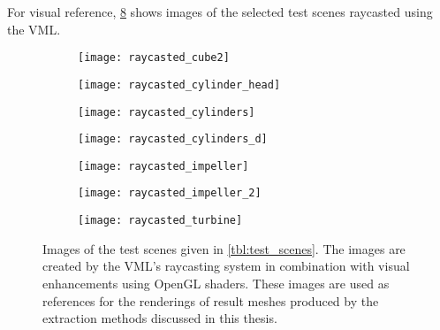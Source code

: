 For visual reference, \cref{fig:raycasted_scenes} shows images of the selected test scenes raycasted using the VML.
%
\begin{figure}[!]
	\centering
	\begin{subfigure}[b]{0.43\textwidth}
		\centering
		\texttt{[image: raycasted\_cube2]}
		\caption{\cubes}
		\label{fig:cube2_raycasted}
	\end{subfigure}
	\begin{subfigure}[b]{0.43\textwidth}
		\centering
		\texttt{[image: raycasted\_cylinder\_head]}
		\caption{\cylinderhead}
		\label{fig:cylinder_head_raycasted}
	\end{subfigure}
	\begin{subfigure}[b]{0.43\textwidth}
		\centering
		\texttt{[image: raycasted\_cylinders]}
		\caption{\cylinders}
		\label{fig:cylinders_raycasted}
	\end{subfigure}
	\begin{subfigure}[b]{0.43\textwidth}
		\centering
		\texttt{[image: raycasted\_cylinders\_d]}
		\caption{\cylindersd}
		\label{fig:cylinders_d_raycasted}
	\end{subfigure}
	\begin{subfigure}[b]{0.43\textwidth}
		\centering
		\texttt{[image: raycasted\_impeller]}
		\caption{\impeller}
		\label{fig:impeller_raycasted}
	\end{subfigure}
	\begin{subfigure}[b]{0.43\textwidth}
		\centering
		\texttt{[image: raycasted\_impeller\_2]}
		\caption{\impellerhalf}
		\label{fig:impeller_2_raycasted}
	\end{subfigure}
	\begin{subfigure}[b]{0.43\textwidth}
		\centering
		\texttt{[image: raycasted\_turbine]}
		\caption{\turbine}
		\label{fig:turbine_raycasted}
	\end{subfigure}
	\caption[Raycasted images of test scenes]{
		Images of the test scenes given in \cref{tbl:test_scenes}.
		The images are created by the VML's raycasting system in combination with visual enhancements using OpenGL shaders.
		These images are used as references for the renderings of result meshes produced by the extraction methods discussed in this thesis.
	}
	\label{fig:raycasted_scenes}
\end{figure}
